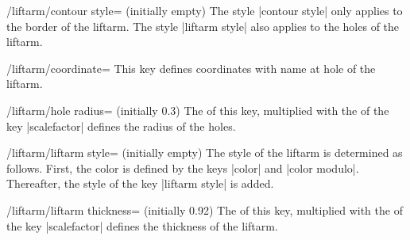 \documentclass[a4paper,english,dvipsnames]{ltxdoc}
\begin{document}
\begin{command}{\liftarm{}}
\begin{stylekey}{/liftarm/contour style= (initially \normalfont empty)}
The style |contour style| only applies to the border of the liftarm. The style |liftarm style| also applies to the holes of the liftarm.
\begin{codeexample}[width=10cm]
\end{codeexample}
\end{stylekey}
\begin{key}{/liftarm/coordinate=}
This key defines coordinates with name  at hole  of the liftarm.
\begin{codeexample}[width=10cm]
\end{codeexample}
\end{key}
\begin{key}{/liftarm/hole radius= (initially 0.3)}
The  of this key, multiplied with the  of the key |scalefactor| defines the radius of the holes.
\begin{codeexample}[width=10cm]
\end{codeexample}
\end{key}
\begin{stylekey}{/liftarm/liftarm style= (initially \normalfont empty)}
The style of the liftarm is determined as follows. First, the color is defined by the keys |color| and |color modulo|. Thereafter, the style of the key |liftarm style| is added.
\end{stylekey}
\begin{key}{/liftarm/liftarm thickness= (initially 0.92)}
The  of this key, multiplied with the  of the key |scalefactor| defines the thickness of the liftarm.
\begin{codeexample}[width=10cm]
\end{codeexample}

\end{key}
\end{command}
\end{document}
